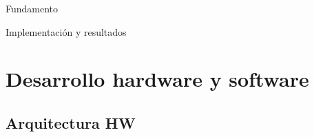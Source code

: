 \documentclass{beamer}
\begin{document}
\begin{frame}{Fundamento}
\begin{center}
\end{center}

\end{frame}

\begin{frame}{Implementación y resultados}
\begin{center}
\end{center}
\end{frame}


\section{Desarrollo hardware y software}

\subsection{Arquitectura HW}
\end{document}
